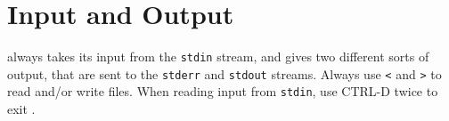 % 
% 
% 
% 
% 
\section{Input and Output}
\shasta always takes its input from the {\tt stdin} stream, and gives
two different sorts of output, that are sent to the {\tt stderr} and
{\tt stdout} streams.
Always use {\tt <} and {\tt >} to read and/or write files.
When reading input from {\tt stdin}, use CTRL-D twice to exit \shasta.

